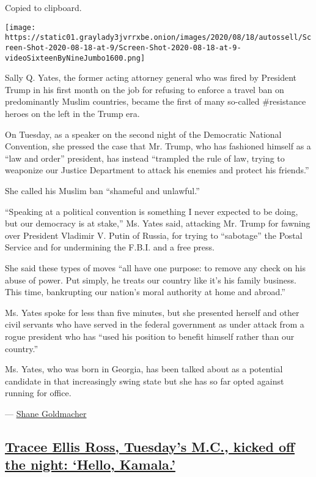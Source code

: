 Copied to clipboard.

\texttt{[image: https://static01.graylady3jvrrxbe.onion/images/2020/08/18/autossell/Screen-Shot-2020-08-18-at-9/Screen-Shot-2020-08-18-at-9-videoSixteenByNineJumbo1600.png]}

Sally Q. Yates, the former acting attorney general who was fired by
President Trump in his first month on the job for refusing to enforce a
travel ban on predominantly Muslim countries, became the first of many
so-called \#resistance heroes on the left in the Trump era.

On Tuesday, as a speaker on the second night of the Democratic National
Convention, she pressed the case that Mr. Trump, who has fashioned
himself as a ``law and order'' president, has instead ``trampled the
rule of law, trying to weaponize our Justice Department to attack his
enemies and protect his friends.''

She called his Muslim ban ``shameful and unlawful.''

``Speaking at a political convention is something I never expected to be
doing, but our democracy is at stake,'' Ms. Yates said, attacking Mr.
Trump for fawning over President Vladimir V. Putin of Russia, for trying
to ``sabotage'' the Postal Service and for undermining the F.B.I. and a
free press.

She said these types of moves ``all have one purpose: to remove any
check on his abuse of power. Put simply, he treats our country like it's
his family business. This time, bankrupting our nation's moral authority
at home and abroad.''

Ms. Yates spoke for less than five minutes, but she presented herself
and other civil servants who have served in the federal government as
under attack from a rogue president who has ``used his position to
benefit himself rather than our country.''

Ms. Yates, who was born in Georgia, has been talked about as a potential
candidate in that increasingly swing state but she has so far opted
against running for office.

--- \href{https://www.nytimes3xbfgragh.onion/by/shane-goldmacher}{Shane
Goldmacher}

\hypertarget{tracee-ellis-ross-tuesdays-mc-kicked-off-the-night-hello-kamala}{%
\subsection{\texorpdfstring{\protect\hyperlink{tracee-ellis-ross-tuesdays-mc-kicked-off-the-night-hello-kamala}{Tracee
Ellis Ross, Tuesday's M.C., kicked off the night: `Hello,
Kamala.'}}{Tracee Ellis Ross, Tuesday's M.C., kicked off the night: `Hello, Kamala.'}}\label{tracee-ellis-ross-tuesdays-mc-kicked-off-the-night-hello-kamala}}

